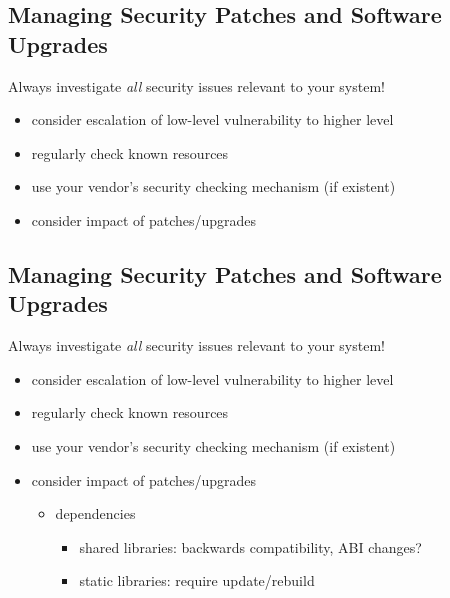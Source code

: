 \documentclass[xga]{xdvislides}
\begin{document}
\subsection{Managing Security Patches and Software Upgrades}
Always investigate {\em all} security issues relevant to your system!
\begin{itemize}
	\item consider escalation of low-level vulnerability to higher level
	\item regularly check known resources
	\item use your vendor's security checking mechanism (if existent)
	\item consider impact of patches/upgrades
\end{itemize}

\subsection{Managing Security Patches and Software Upgrades}
Always investigate {\em all} security issues relevant to your system!
\begin{itemize}
	\item consider escalation of low-level vulnerability to higher level
	\item regularly check known resources
	\item use your vendor's security checking mechanism (if existent)
	\item consider impact of patches/upgrades
		\begin{itemize}
			\item dependencies
				\begin{itemize}
					\item shared libraries:  backwards compatibility, ABI
						changes?
					\item static libraries:  require update/rebuild
				\end{itemize}
		\end{itemize}
\end{itemize}
\end{document}
